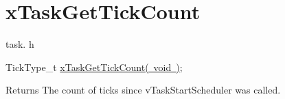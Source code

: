 \hypertarget{group__x_task_get_tick_count}{}\section{x\+Task\+Get\+Tick\+Count}
\label{group__x_task_get_tick_count}
task. h 
\begin{DoxyPre}TickType\_t \mbox{\hyperlink{task_8h_a753ecfe23e7386066ecccad5d16422f7}{xTaskGetTickCount( void )}};\end{DoxyPre}


\begin{DoxyReturn}{Returns}
The count of ticks since v\+Task\+Start\+Scheduler was called. 
\end{DoxyReturn}
